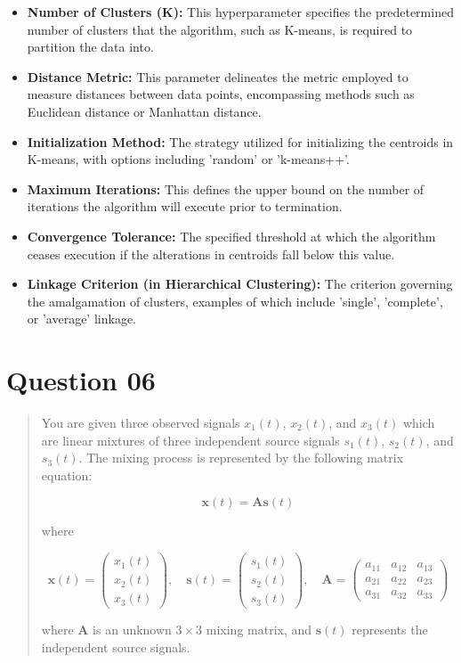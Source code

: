 \documentclass{exam}
\begin{document}
\begin{itemize} 
 \item \textbf{Number of Clusters (K):} This hyperparameter specifies the predetermined number of clusters that the algorithm, such as K-means, is required to partition the data into.
 \item \textbf{Distance Metric:} This parameter delineates the metric employed to measure distances between data points, encompassing methods such as Euclidean distance or Manhattan distance.
 \item \textbf{Initialization Method:} The strategy utilized for initializing the centroids in K-means, with options including 'random' or 'k-means++'.
 \item \textbf{Maximum Iterations:} This defines the upper bound on the number of iterations the algorithm will execute prior to termination.
 \item \textbf{Convergence Tolerance:} The specified threshold at which the algorithm ceases execution if the alterations in centroids fall below this value.
 \item \textbf{Linkage Criterion (in Hierarchical Clustering):} The criterion governing the amalgamation of clusters, examples of which include 'single', 'complete', or 'average' linkage.
\end{itemize}

\section{Question 06}

\begin{quote}
You are given three observed signals \( x_1(t) \), \( x_2(t) \), and \( x_3(t) \) which are linear mixtures of three independent source signals \( s_1(t) \), \( s_2(t) \), and \( s_3(t) \). The mixing process is represented by the following matrix equation:

\[
\mathbf{x}(t) = \mathbf{A} \mathbf{s}(t)
\]

where

\[
\mathbf{x}(t) = \begin{pmatrix} x_1(t) \\ x_2(t) \\ x_3(t) \end{pmatrix}, \quad \mathbf{s}(t) = \begin{pmatrix} s_1(t) \\ s_2(t) \\ s_3(t) \end{pmatrix}, \quad \mathbf{A} = \begin{pmatrix} a_{11} & a_{12} & a_{13} \\ a_{21} & a_{22} & a_{23} \\ a_{31} & a_{32} & a_{33} \end{pmatrix}
\]

where \( \mathbf{A} \) is an unknown \( 3 \times 3 \) mixing matrix, and \( \mathbf{s}(t) \) represents the independent source signals.
\end{quote}
\end{document}

